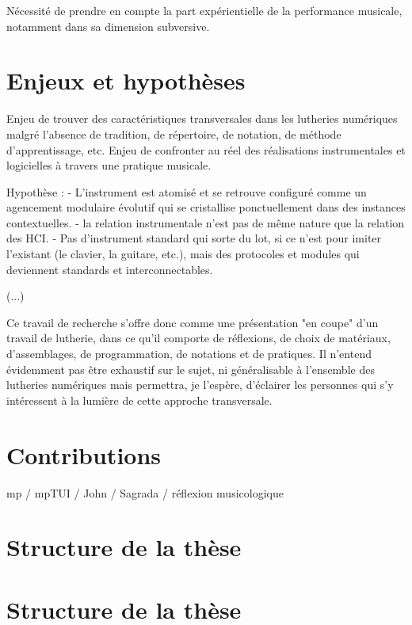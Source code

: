 Nécessité de prendre en compte la part expérientielle de la performance musicale, notamment dans sa dimension subversive.

\section{Enjeux et hypothèses}

Enjeu de trouver des caractéristiques transversales dans les lutheries numériques malgré l'absence de tradition, de répertoire, de notation, de méthode d'apprentissage, etc.
Enjeu de confronter au réel des réalisations instrumentales et logicielles à travers une pratique musicale.

Hypothèse :
- L'instrument est atomisé et se retrouve configuré comme un agencement modulaire évolutif qui se cristallise ponctuellement dans des instances contextuelles.
- la relation instrumentale n'est pas de même nature que la relation des HCI.
- Pas d'instrument standard qui sorte du lot, si ce n'est pour imiter l'existant (le clavier, la guitare, etc.), mais des protocoles et modules qui deviennent standards et interconnectables.

(...)

%
Ce travail de recherche s'offre donc comme une présentation "en coupe" d'un travail de lutherie, dans ce qu'il comporte de réflexions, de choix de matériaux, d'assemblages, de programmation, de notations et de pratiques. Il n'entend évidemment pas être exhaustif sur le sujet, ni généralisable à l'ensemble des lutheries numériques mais permettra, je l'espère, d'éclairer les personnes qui s'y intéressent à la lumière de cette approche transversale.
%




\section{Contributions}

mp / mpTUI / John / Sagrada / réflexion musicologique

\section{Structure de la thèse}

\section{Structure de la thèse}
\label{sec:preamble:structure}

